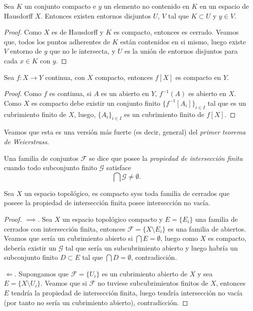 \documentclass[11pt,oneside,a4paper]{book}
\begin{document}
\begin{lem}
Sea $K$ un conjunto compacto e $y$ un elemento no contenido en $K$ en un espacio de Hausdorff $X$. Entonces existen entornos disjuntos $U$, $V$ tal que $K\subset U$ y $y\in V$.
\end{lem}
\begin{proof}
Como $X$ es de Hausdorff y $K$ es compacto, entonces es cerrado. Veamos que, todos los puntos adherentes de $K$ están contenidos en si mismo, luego existe $V$ entorno de $y$ que no le intersecta, y $U$ es la unión de entornos disjuntos para cada $x\in K$ con $y$.
\end{proof}
\begin{thm}
Sea $f:X\rightarrow Y$ continua, con $X$ compacto, entonces $f[X]$ es compacto en $Y$.
\end{thm}
\begin{proof}
Como $f$ es continua, si $A$ es un abierto en $Y$, $f^{-1}(A)$ es abierto en $X$. Como $X$ es compacto debe existir un conjunto finito $\{f^{-1}[A_i]\}_{i\in I}$ tal que es un cubrimiento finito de $X$, luego, $\{A_i\}_{i\in I}$ es un cubrimiento finito de $f[X]$.
\end{proof}
Veamos que esta es una versión más fuerte (es decir, general) del \textit{primer teorema de Weierstrass}.
\begin{mydef}
Una familia de conjuntos $\mathcal{F}$ se dice que posee la \textit{propiedad de intersección finita} cuando todo subconjunto finito $\mathcal{G}$ satisface
$$\bigcap\mathcal{G}\neq\emptyset.$$
\end{mydef}
\begin{lem}
Sea $X$ un espacio topológico, es compacto syss toda familia de cerrados que poseee la propiedad de intersección finita posee intersección no vacía.
\end{lem}
\begin{proof}
$\implies$. Sea $X$ un espacio topológico compacto y $E=\{E_i\}$ una familia de cerrados con intersección finita, entonces $\mathcal{F}=\{X\setminus E_i\}$ es una familia de abiertos. Veamos que sería un cubrimiento abierto si $\bigcap E=\emptyset$, luego como $X$ es compacto, debería existir un $\mathcal{G}$ tal que sería un subcubrimiento abierto y luego habría un subconjunto finito $D\subset E$ tal que $\bigcap D=\emptyset$, contradicción.

$\Longleftarrow$. Supongamos que $\mathcal{F}=\{U_i\}$ es un cubrimiento abierto de $X$ y sea $E=\{X\setminus U_i\}$. Veamos que si $\mathcal{F}$ no tuviese subcubrimientos finitos de $X$, entonces $E$ tendría la propiedad de intersección finita, luego tendría intersección no vacía (por tanto no sería un cubrimiento abierto), contradicción.
\end{proof}
\end{document}

